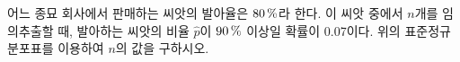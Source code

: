 \noindent\begin{minipage}[t]{0.58\linewidth}\vspace{0pt}\raggedright 어느 종묘 회사에서 판매하는 씨앗의 발아율은 $80\mkern3mu \%$라 한다. 이 씨앗 중에서 $n$개를 임의추출할 때, 발아하는 씨앗의 비율 $\hat{p}$이 $90\mkern3mu \%$ 이상일 확률이 0.07이다. 위의 표준정규분포표를 이용하여 $n$의 값을 구하시오. \end{minipage}\hfill\begin{minipage}[t]{0.4\linewidth}\vspace{0pt}\centering \resizebox{\ifdim\width>\linewidth\linewidth\else\width\fi}{!}{}\end{minipage}\par
